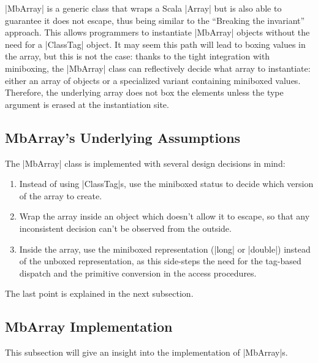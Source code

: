 

|MbArray| is a generic class that wraps a Scala |Array| but is also able to guarantee it does not escape, thus being similar to the ``Breaking the invariant'' approach. This allows programmers to instantiate |MbArray| objects without the need for a |ClassTag| object. It may seem this path will lead to boxing values in the array, but this is not the case: thanks to the tight integration with miniboxing, the |MbArray| class can reflectively decide what array to instantiate: either an array of objects or a specialized variant containing miniboxed values. Therefore, the underlying array does not box the elements unless the type argument is erased at the instantiation site.

\subsection{MbArray's Underlying Assumptions}
\label{subsec:assumptions}

The |MbArray| class is implemented with several design decisions in mind: 

\begin{enumerate}
  \item Instead of using |ClassTag|s, use the miniboxed status to decide which version of the array to create.
  \item Wrap the array inside an object which doesn't allow it to escape, so that any inconsistent decision can't be observed from the outside.
  \item Inside the array, use the miniboxed representation (|long| or |double|) instead of the unboxed representation, as this side-steps the need for the tag-based dispatch and the primitive conversion in the access procedures.
\end{enumerate}

The last point is explained in the next subsection.

\subsection{MbArray Implementation}
\label{subsec:mbarrayimpl}

This subsection will give an insight into the implementation of |MbArray|s.

